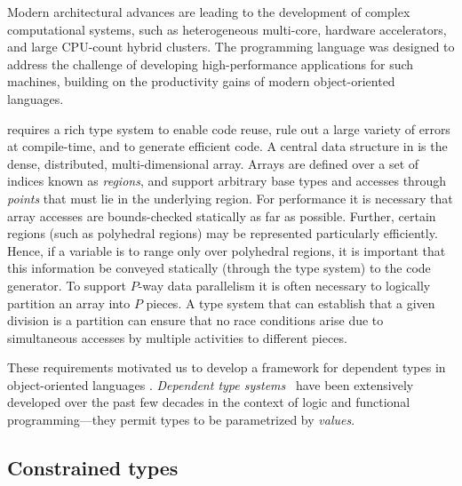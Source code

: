 

Modern architectural advances are leading to the development of
complex computational systems, such as heterogeneous multi-core,
hardware accelerators, and large CPU-count hybrid clusters.
The \Xten{} programming language \cite{X10-concur,x10-oopsla05,X10} was
designed to address the challenge of developing
high-performance applications for such machines, building on the
productivity gains of modern object-oriented languages.

\Xten{} requires a rich type system
to enable code reuse, rule out a large variety of errors at
compile-time, and to generate efficient code.
A central
data structure in \Xten{} is the dense, distributed, multi-dimensional
array.  Arrays are defined over a set of indices known as \emph{regions},
and support arbitrary base types and accesses through {\em
points} that must lie in the underlying region. For performance it is
necessary that array accesses are
bounds-checked statically as far as possible.
Further, certain regions (such as
polyhedral regions) may be represented particularly
efficiently.  Hence, if a variable is to range only over
polyhedral regions, it is important that this information be conveyed
statically (through the type system) to the code 
generator. To support $P$-way data parallelism it is often necessary
to logically partition an array into $P$ pieces. A type system that
can establish that a given division is a partition can ensure that no
race conditions arise due to simultaneous accesses by
multiple activities to different pieces.

These requirements motivated us to develop a framework for dependent
types in object-oriented languages \cite{constrained-types}.  \emph{Dependent type
systems}~\cite{dependent-types,xi99dependent,calc-constructions}
have been extensively developed over the past few decades in the
context of logic and functional programming---they permit types to be
parametrized by \emph{values}.

\subsection{Constrained types}

